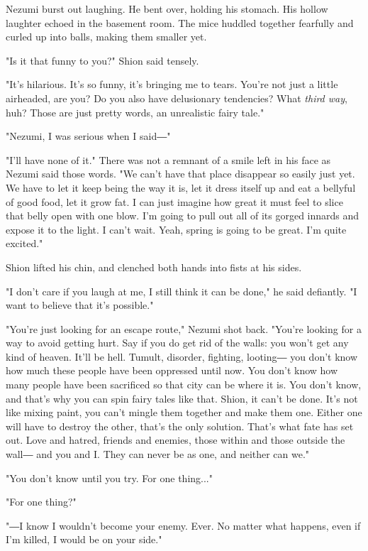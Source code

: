 Nezumi burst out laughing. He bent over, holding his stomach. His hollow
laughter echoed in the basement room. The mice huddled together
fearfully and curled up into balls, making them smaller yet.

"Is it that funny to you?" Shion said tensely.

"It's hilarious. It's so funny, it's bringing me to tears. You're not
just a little airheaded, are you? Do you also have delusionary
tendencies? What \emph{third way}, huh? Those are just pretty words, an
unrealistic fairy tale."

"Nezumi, I was serious when I said―"

"I'll have none of it." There was not a remnant of a smile left in his
face as Nezumi said those words. "We can't have that place disappear so
easily just yet. We have to let it keep being the way it is, let it
dress itself up and eat a bellyful of good food, let it grow fat. I can
just imagine how great it must feel to slice that belly open with one
blow. I'm going to pull out all of its gorged innards and expose it to
the light. I can't wait. Yeah, spring is going to be great. I'm quite
excited."

Shion lifted his chin, and clenched both hands into fists at his sides.

"I don't care if you laugh at me, I still think it can be done," he said
defiantly. "I want to believe that it's possible."

"You're just looking for an escape route," Nezumi shot back. "You're
looking for a way to avoid getting hurt. Say if you do get rid of the
walls: you won't get any kind of heaven. It'll be hell. Tumult,
disorder, fighting, looting― you don't know how much these people have
been oppressed until now. You don't know how many people have been
sacrificed so that city can be where it is. You don't know, and that's
why you can spin fairy tales like that. Shion, it can't be done. It's
not like mixing paint, you can't mingle them together and make them one.
Either one will have to destroy the other, that's the only solution.
That's what fate has set out. Love and hatred, friends and enemies,
those within and those outside the wall― and you and I. They can never
be as one, and neither can we."

\mybreak

"You don't know until you try. For one thing..."

"For one thing?"

"―I know I wouldn't become your enemy. Ever. No matter what happens,
even if I'm killed, I would be on your side."

